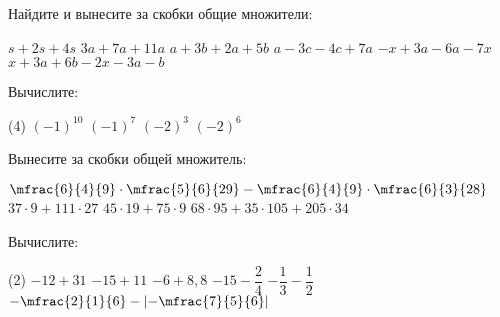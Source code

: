 \begin{homework}[number=1]
	\begin{listofex}
		\item Найдите и вынесите за скобки общие множители: %
		\begin{tasks}
			\task \( s+2s+4s \)
			\task \( 3a+7a+11a \)
			\task \( a+3b+2a+5b \)
			\task \( a-3c-4c+7a \)
			\task \( -x+3a-6a-7x \)
			\task \( x+3a+6b-2x-3a-b \)
		\end{tasks}
		\item Вычислите:
		\begin{tasks}(4)
			\task \( (-1)^{10} \)
			\task \( (-1)^7 \)
			\task \( (-2)^3 \)
			\task \( (-2)^6 \)
		\end{tasks}
		\item Вынесите за скобки общей множитель: %
		\begin{tasks}
			\task \( \mfrac{ 6 }{4  }{ 9 } \cdot \mfrac{ 5 }{ 6 }{ 29 }-\mfrac{ 6 }{4  }{ 9 } \cdot \mfrac{ 6 }{ 3 }{ 28 } \)
			\task \(37 \cdot 9+111\cdot27 \)
			\task \( 45 \cdot 19 + 75 \cdot9 \)
			\task \( 68 \cdot 95 + 35 \cdot 105 + 205 \cdot 34 \)
			
		\end{tasks}
		\item Вычислите:
		\begin{tasks}(2)
			\task \( -12 + 31 \)
			\task \( -15+11 \)
			\task \( -6+8,8 \)
			\task \( -15-\dfrac{2}{4} \)
			\task \( -\dfrac{1}{3}-\dfrac{1}{2} \)
			\task \( -\mfrac{2}{1}{6}-\left|-\mfrac{7}{5}{6}\right| \)
		\end{tasks}
	\end{listofex}
\end{homework}

